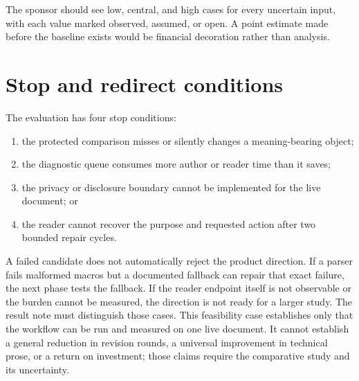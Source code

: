 The sponsor should see low, central, and high cases for every uncertain input,
with each value marked observed, assumed, or open. A point estimate made before
the baseline exists would be financial decoration rather than analysis.

\section{Stop and redirect conditions}

The evaluation has four stop conditions:

\begin{enumerate}
\item the protected comparison misses or silently changes a meaning-bearing
      object;
\item the diagnostic queue consumes more author or reader time than it saves;
\item the privacy or disclosure boundary cannot be implemented for the live
      document; or
\item the reader cannot recover the purpose and requested action after two
      bounded repair cycles.
\end{enumerate}

A failed candidate does not automatically reject the product direction. If a
parser fails malformed macros but a documented fallback can repair that exact
failure, the next phase tests the fallback. If the reader endpoint itself is
not observable or the burden cannot be measured, the direction is not ready for
a larger study. The result note must distinguish those cases.
This feasibility case establishes only that the workflow can be run and measured
on one live document. It cannot establish a general reduction in revision
rounds, a universal improvement in technical prose, or a return on investment;
those claims require the comparative study and its uncertainty.

